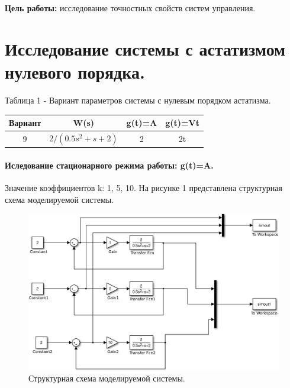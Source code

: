 \documentclass[a4paper,14pt]{article}
\begin{document}
\textbf {Цель работы:} исследование точностных свойств систем управления.
\section{Исследование системы с астатизмом нулевого порядка.}
Таблица 1 - Вариант параметров системы с нулевым порядком астатизма. 

\begin{center}
\begin{tabular}{ |c|c|c|c| } 
 \hline
 Вариант & W(s) & g(t)=A & g(t)=Vt \\ 
 \hline
 9 & $ 2/(0.5s^2+s+2) $ & 2 & 2t \\ 
 \hline
\end{tabular}
\end{center}

\paragraph{Иследование стационарного режима работы: g(t)=A.}
Значение коэффициентов k: 1, 5, 10.
На рисунке 1 представлена структурная схема моделируемой системы.
\begin{figure}[h!]
\centering
\includegraphics[width=\textwidth]{1/1_1.eps}
\caption{Структурная схема моделируемой  системы.}
\end{figure}
\end{document}
